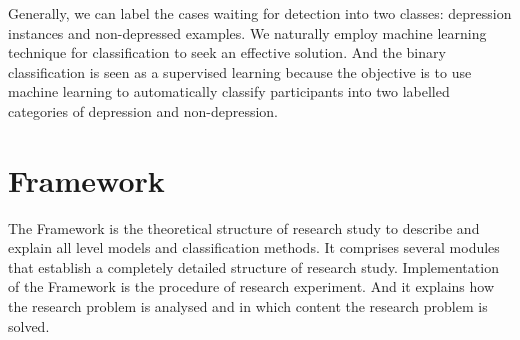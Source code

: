 \documentclass[12pt]{article}
\begin{document}
Generally, we can label the cases waiting for detection into two classes: depression instances and non-depressed examples. We naturally employ machine learning technique for classification to seek an effective solution. And the binary classification is seen as a supervised learning because the objective is to use machine learning to automatically classify participants into two labelled categories of depression and non-depression.
\\
\bigskip
\goodbreak

\section{Framework}
The Framework is the theoretical structure of research study to describe and explain all level models and classification methods. It comprises several modules that establish a completely detailed structure of research study. Implementation of the Framework is the procedure of research experiment. And it explains how the research problem is analysed and in which content the research problem is solved. 
\end{document}

